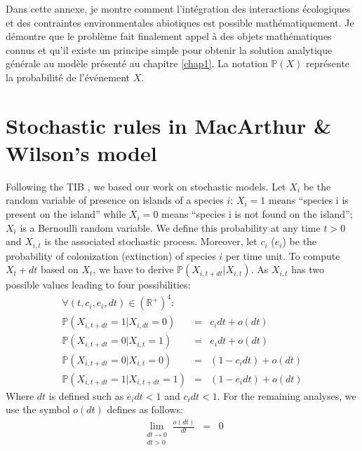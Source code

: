 \label{annII}
\addtocounter{chapter}{1}
\setcounter{equation}{0}


Dans cette annexe, je montre comment l'intégration des interactions écologiques
et des contraintes environmentales abiotiques est possible mathématiquement.
Je démontre que le problème fait finalement appel à des objets mathématiques
connus et qu'il existe un principe simple pour obtenir la solution analytique
générale au modèle présenté au chapitre \ref{chap1}. La notation $\mathbb{P}(X)$
représente la probabilité de l'événement $X$.





\section{Stochastic rules in MacArthur \& Wilson's model}

Following the TIB \cite{MacArthur1967}, we based our work on stochastic models. Let $X_{i}$ be the random variable of presence on islands of a species $i$; $X_i=1$ means ``species i is present on the island'' while $X_i=0$ means ``species i is not found on the island''; $X_i$ is a Bernoulli random variable. We define this probability at any time $t>0$ and $X_{i,t}$ is the associated stochastic process. Moreover, let $c_i$ ($e_i$) be the probability of colonization (extinction) of species $i$ per time unit. To compute $X_t+dt$ based on $X_t$, we have to derive $ \mathbb{P}(X_{i,t+dt}|X_{i,t})$. As $X_{i,t}$ has two possible values leading to four possibilities:
\begin{eqnarray}
\nonumber \forall (t,c_i, e_i,dt)\in (\mathbb{R}^{+})^{4}: & &  \\
\label{eqAnn2_1} \mathbb{P}(X_{i,t+dt}=1|X_{i,dt}=0)&=&c_idt+o(dt)\\
\label{eqAnn2_2} \mathbb{P}(X_{i,t+dt}=0|X_{i,t}=1)&=&e_idt+o(dt) \\
\label{eqAnn2_3} \mathbb{P}(X_{i,t+dt}=0|X_{i,t}=0)&=&(1-c_idt)+o(dt) \\
\label{eqAnn2_4} \mathbb{P}(X_{i,t+dt}=1|X_{i,t+dt}=1)&=&(1-e_idt)+o(dt)
\end{eqnarray}
Where $dt$ is defined such as $e_idt<1$ and $c_idt<1$. For the remaining analyses, we use the symbol $o(dt)$ defines as follows:
\begin{eqnarray}
\nonumber \lim\limits_{\substack{dt \to 0 \\ dt>0}}\frac{o(dt)}{dt}&=&0
\end{eqnarray}

